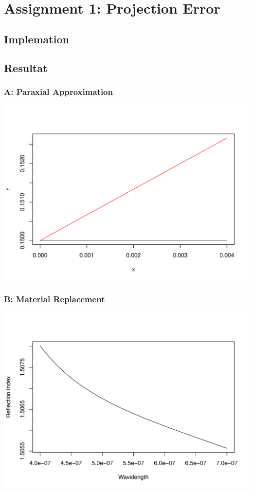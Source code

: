 \documentclass[12pt]{article}
\begin{document}
\section{Assignment 1: Projection Error}

\subsection{Implemation}

\subsection{Resultat}

\subsubsection{A: Paraxial Approximation}

\includegraphics[scale=1.0]{para_approx.pdf}

\subsubsection{B: Material Replacement}
\includegraphics[scale=1.0]{BK7_index.pdf}
\end{document}
